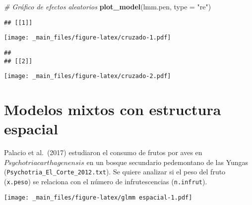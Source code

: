 \documentclass[
]{book}
\newenvironment{Shaded}{\begin{snugshade}}{\end{snugshade}}
\newcommand{\CommentTok}[1]{\textcolor[rgb]{0.56,0.35,0.01}{\textit{#1}}}
\newcommand{\DataTypeTok}[1]{\textcolor[rgb]{0.13,0.29,0.53}{#1}}
\newcommand{\DecValTok}[1]{\textcolor[rgb]{0.00,0.00,0.81}{#1}}
\newcommand{\KeywordTok}[1]{\textcolor[rgb]{0.13,0.29,0.53}{\textbf{#1}}}
\newcommand{\NormalTok}[1]{#1}
\newcommand{\OperatorTok}[1]{\textcolor[rgb]{0.81,0.36,0.00}{\textbf{#1}}}
\newcommand{\OtherTok}[1]{\textcolor[rgb]{0.56,0.35,0.01}{#1}}
\newcommand{\StringTok}[1]{\textcolor[rgb]{0.31,0.60,0.02}{#1}}
\begin{document}
\begin{Shaded}
\begin{Highlighting}[]
\CommentTok{# Gráfico de efectos aleatorios}
\KeywordTok{plot_model}\NormalTok{(lmm.pen, }\DataTypeTok{type =} \StringTok{"re"}\NormalTok{)}
\end{Highlighting}
\end{Shaded}

\begin{verbatim}
## [[1]]
\end{verbatim}

\texttt{[image: \_main\_files/figure-latex/cruzado-1.pdf]}

\begin{verbatim}
## 
## [[2]]
\end{verbatim}

\texttt{[image: \_main\_files/figure-latex/cruzado-2.pdf]}

\hypertarget{modelos-mixtos-con-estructura-espacial}{%
\section{Modelos mixtos con estructura espacial}\label{modelos-mixtos-con-estructura-espacial}}

Palacio et al.~(2017) estudiaron el consumo de frutos por aves en \(Psychotria carthagenensis\) en un bosque secundario pedemontano de las Yungas (\texttt{Psychotria\_El\_Corte\_2012.txt}). Se quiere analizar si el peso del fruto (\texttt{x.peso}) se relaciona con el número de infrutescencias (\texttt{n.infrut}).

\begin{Shaded}
\end{Shaded}

\texttt{[image: \_main\_files/figure-latex/glmm espacial-1.pdf]}

\begin{Shaded}
\end{Shaded}
\end{document}
